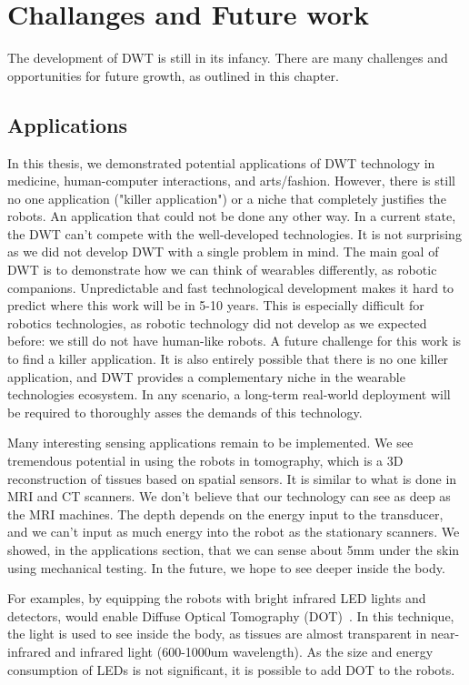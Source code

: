 \chapter{Challanges and Future work}
The development of DWT is still in its infancy. There are many challenges and opportunities for future growth, as outlined in this chapter. 

\section{Applications}
In this thesis, we demonstrated potential applications of DWT technology in medicine, human-computer interactions, and arts/fashion. However, there is still no one application ("killer application") or a niche that completely justifies the robots.  An application that could not be done any other way. In a current state, the DWT can't compete with the well-developed technologies. It is not surprising as we did not develop DWT with a single problem in mind. The main goal of DWT is to demonstrate how we can think of wearables differently, as robotic companions. 
Unpredictable and fast technological development makes it hard to predict where this work will be in 5-10 years. This is especially difficult for robotics technologies, as robotic technology did not develop as we expected before: we still do not have human-like robots.  A future challenge for this work is to find a killer application. It is also entirely possible that there is no one killer application, and DWT provides a complementary niche in the wearable technologies ecosystem. In any scenario, a long-term real-world deployment will be required to thoroughly asses the demands of this technology. 

Many interesting sensing applications remain to be implemented. We see tremendous potential in using the robots in tomography, which is a 3D reconstruction of tissues based on spatial sensors. It is similar to what is done in MRI and CT scanners. We don't believe that our technology can see as deep as the MRI machines. The depth depends on the energy input to the transducer, and we can't input as much energy into the robot as the stationary scanners. We showed, in the applications section, that we can sense about 5mm under the skin using mechanical testing. In the future, we hope to see deeper inside the body.

For examples, by equipping the robots with bright infrared LED lights and detectors, would enable Diffuse Optical Tomography (DOT)~\cite{boas2001imaging}. In this technique, the light is used to see inside the body, as tissues are almost transparent in near-infrared and infrared light (600-1000um wavelength). As the size and energy consumption of LEDs is not significant, it is possible to add DOT to the robots. 

